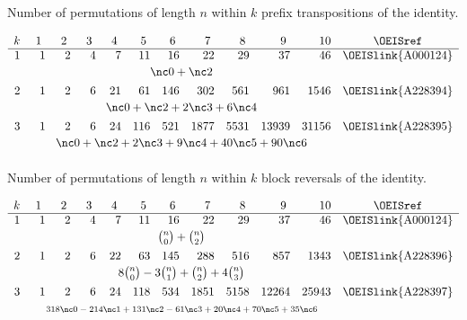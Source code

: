 \documentclass[12pt,twoside]{memoir}
\begin{document}
      \begin{table}[t]
      \caption{Number of permutations of length $n$ within $k$ prefix transpositions of the 
      identity.}
      \begin{footnotesize}
      $$
      \begin{array}{rrrrrrrrrrrc}
      k &\ 1\ &\ 2\ &\ 3\ &\ 4\ &\ 5\ &\ 6\ &\ 7\ &\ 8\ &\ 9\
      &10&\text{\OEISref}\\\hline 1& 1& 2& 4& 7& 11& 16& 22& 29& 37&
      46& \text{\OEISlink{A000124}}\\[0.5ex]
      &\multicolumn{10}{c}{\nc0 + \nc2  }&\\[1ex]
      2& 1& 2& 6& 21& 61& 146& 302& 561& 961& 1546& \text{\OEISlink{A228394}}\\[0.5ex]
      &\multicolumn{10}{c}{\nc0 + \nc2  + 2\nc3 + 6\nc4 }&\\[1ex]
      3& 1& 2& 6& 24& 116& 521& 1877& 5531& 13939&
      31156&\text{\OEISlink{A228395}}\\[0.5ex]
      &\multicolumn{10}{c}{\nc0 + \nc2 + 2\nc3 + 9\nc4 + 40\nc5 + 90\nc6
      }&\\[1ex]
      \end{array}
      $$
      \end{footnotesize}
      \end{table}
    
      \begin{table}[t]
      \caption{Number of permutations of length $n$ within $k$ block reversals of the
      identity.}
      \begin{footnotesize}
      $$
      \begin{array}{rrrrrrrrrrrc}
      k &\ 1\ &\ 2\ &\ 3\ &\ 4\ &\ 5\ &\ 6\ &\ 7\ &\ 8\ &\ 9\
      &10&\text{\OEISref}\\\hline
      1&1&2&4&7&11&16&22&29&37&46&\text{\OEISlink{A000124}}\\[0.5ex]
      &\multicolumn{10}{c}{{n\choose 0}+{n\choose 2}}&\\[1ex]
      2&1&2&6&22&63&145&288&516&857&1343&\text{\OEISlink{A228396}}\\[0.5ex]
      &\multicolumn{10}{c}{8{n\choose 0}-3{n\choose 1}+{n\choose 2}+4{n\choose 3}}&\\[1ex]
      3&1&2&6&24&118&534&1851&5158&12264&25943&\text{\OEISlink{A228397}}\\[0.5ex]
      &\multicolumn{10}{c}{\text{ \scriptsize $318\nc0 -214\nc1 +131\nc2 -61\nc3
      +20\nc4 +70\nc5 +35\nc6$  }}&\\[1ex]\end{array}
      $$
      \end{footnotesize}
      \end{table}
    
\end{document}
